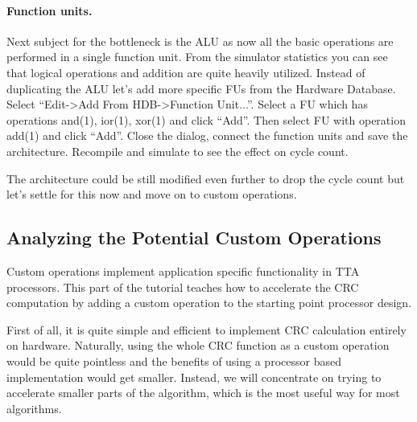 \documentclass[twoside]{tceusermanual}
\begin{document}
\paragraph{Function units.}
Next subject for the bottleneck is the ALU as now all the basic operations
are performed in a single function unit. From the simulator statistics you can
see that logical operations and addition are quite heavily utilized. Instead
of duplicating the ALU let's add more specific FUs from the Hardware Database.
Select ``Edit->Add From HDB->Function Unit...''. Select a FU which has
operations and(1), ior(1), xor(1) and click ``Add''. Then select FU with operation
add(1) and click ``Add''. Close the dialog, connect the function units and save the
architecture. Recompile and simulate to see the effect on cycle count.

The architecture could be still modified even further to drop the cycle count
but let's settle for this now and move on to custom operations. 


\subsection{Analyzing the Potential Custom Operations}
\label{ssec:anal_custom}
Custom operations implement application specific functionality in TTA
processors. This part of the tutorial teaches how to accelerate the
CRC computation by adding a custom operation to the starting point
processor design.


First of all, it is quite simple and efficient to implement CRC
calculation entirely on hardware. Naturally, using the whole CRC
function as a custom operation would be quite pointless and the
benefits of using a processor based implementation would get
smaller. Instead, we will concentrate on trying to accelerate
smaller parts of the algorithm, which is the most useful way for most
algorithms.
\end{document}
